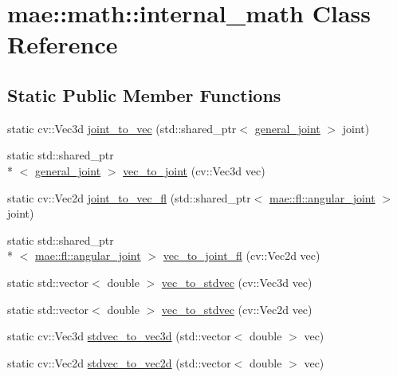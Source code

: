 \hypertarget{classmae_1_1math_1_1internal__math}{\section{mae\-:\-:math\-:\-:internal\-\_\-math Class Reference}
\label{classmae_1_1math_1_1internal__math}
}
\subsection*{Static Public Member Functions}
\begin{DoxyCompactItemize}
\item 
static cv\-::\-Vec3d \hyperlink{classmae_1_1math_1_1internal__math_a7a1ddbd16888381f3df418277a42ffc0}{joint\-\_\-to\-\_\-vec} (std\-::shared\-\_\-ptr$<$ \hyperlink{classmae_1_1general__joint}{general\-\_\-joint} $>$ joint)
\item 
static std\-::shared\-\_\-ptr\\*
$<$ \hyperlink{classmae_1_1general__joint}{general\-\_\-joint} $>$ \hyperlink{classmae_1_1math_1_1internal__math_adddcf4c2eeea3fc38a0fa0a429e5dbdc}{vec\-\_\-to\-\_\-joint} (cv\-::\-Vec3d vec)
\item 
static cv\-::\-Vec2d \hyperlink{classmae_1_1math_1_1internal__math_a9242962199c8992629f4f1dfffa5aa1f}{joint\-\_\-to\-\_\-vec\-\_\-fl} (std\-::shared\-\_\-ptr$<$ \hyperlink{classmae_1_1fl_1_1angular__joint}{mae\-::fl\-::angular\-\_\-joint} $>$ joint)
\item 
static std\-::shared\-\_\-ptr\\*
$<$ \hyperlink{classmae_1_1fl_1_1angular__joint}{mae\-::fl\-::angular\-\_\-joint} $>$ \hyperlink{classmae_1_1math_1_1internal__math_aae7656685150c31faeb8bb6ee3ab293a}{vec\-\_\-to\-\_\-joint\-\_\-fl} (cv\-::\-Vec2d vec)
\item 
static std\-::vector$<$ double $>$ \hyperlink{classmae_1_1math_1_1internal__math_a2c87dbd858aa4356be79648ada60a9c6}{vec\-\_\-to\-\_\-stdvec} (cv\-::\-Vec3d vec)
\item 
static std\-::vector$<$ double $>$ \hyperlink{classmae_1_1math_1_1internal__math_a9dcb699555d2ebc7e7508d8975d07e02}{vec\-\_\-to\-\_\-stdvec} (cv\-::\-Vec2d vec)
\item 
static cv\-::\-Vec3d \hyperlink{classmae_1_1math_1_1internal__math_ab4d16eafea7504a2a13cc1e7ffd3bfa6}{stdvec\-\_\-to\-\_\-vec3d} (std\-::vector$<$ double $>$ vec)
\item 
static cv\-::\-Vec2d \hyperlink{classmae_1_1math_1_1internal__math_abcd409563831df347ef6cd7c89504b6e}{stdvec\-\_\-to\-\_\-vec2d} (std\-::vector$<$ double $>$ vec)

\end{DoxyCompactItemize}
